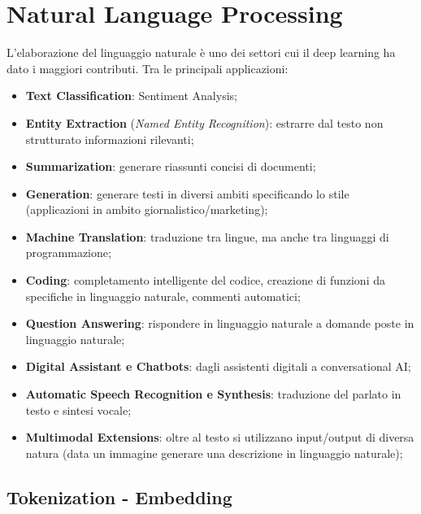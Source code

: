\section{Natural Language Processing}\label{sec:nlp} %
L'elaborazione del linguaggio naturale è uno dei settori cui il deep learning ha dato i maggiori contributi.
Tra le principali applicazioni:
\begin{itemize}
    \item \textbf{Text Classification}: Sentiment Analysis;
    \item \textbf{Entity Extraction} (\textit{Named Entity Recognition}): estrarre dal testo non strutturato informazioni rilevanti;
    \item \textbf{Summarization}: generare riassunti concisi di documenti;
    \item \textbf{Generation}: generare testi in diversi ambiti specificando lo stile (applicazioni in ambito giornalistico/marketing);
    \item \textbf{Machine Translation}: traduzione tra lingue, ma anche tra linguaggi di programmazione;
    \item \textbf{Coding}: completamento intelligente del codice, creazione di funzioni da specifiche in linguaggio naturale, commenti automatici;
    \item \textbf{Question Answering}: rispondere in linguaggio naturale a domande poste in linguaggio naturale;
    \item \textbf{Digital Assistant e Chatbots}: dagli assistenti digitali a conversational AI;
    \item \textbf{Automatic Speech Recognition e Synthesis}: traduzione del parlato in testo e sintesi vocale;
    \item \textbf{Multimodal Extensions}: oltre al testo si utilizzano input/output di diversa natura (data un immagine generare una descrizione in linguaggio naturale);
\end{itemize}
%
\subsection{Tokenization - Embedding}\label{sub:nlp_token_embed} %
